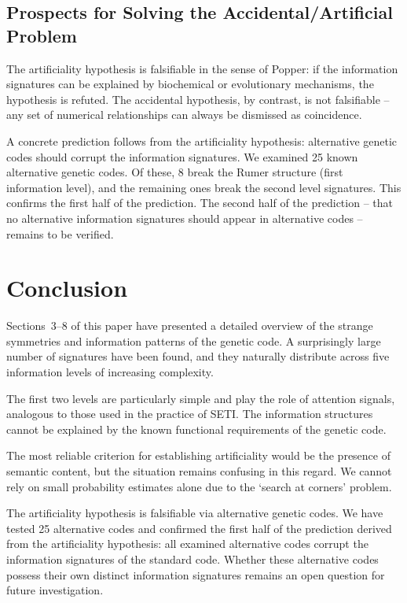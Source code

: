\documentclass[12pt]{article}
\begin{document}
\subsection{Prospects for Solving the Accidental/Artificial Problem}

The artificiality hypothesis is falsifiable in the sense of Popper: if the information signatures can be explained by biochemical or evolutionary mechanisms, the hypothesis is refuted. The accidental hypothesis, by contrast, is not falsifiable -- any set of numerical relationships can always be dismissed as coincidence.

A concrete prediction follows from the artificiality hypothesis: alternative genetic codes should corrupt the information signatures. We examined 25 known alternative genetic codes. Of these, 8 break the Rumer structure (first information level), and the remaining ones break the second level signatures. This confirms the first half of the prediction. The second half of the prediction -- that no alternative information signatures should appear in alternative codes -- remains to be verified.


\section{Conclusion}

Sections~3--8 of this paper have presented a detailed overview of the strange symmetries and information patterns of the genetic code. A surprisingly large number of signatures have been found, and they naturally distribute across five information levels of increasing complexity.

The first two levels are particularly simple and play the role of attention signals, analogous to those used in the practice of SETI. The information structures cannot be explained by the known functional requirements of the genetic code.

The most reliable criterion for establishing artificiality would be the presence of semantic content, but the situation remains confusing in this regard. We cannot rely on small probability estimates alone due to the `search at corners' problem.

The artificiality hypothesis is falsifiable via alternative genetic codes. We have tested 25 alternative codes and confirmed the first half of the prediction derived from the artificiality hypothesis: all examined alternative codes corrupt the information signatures of the standard code. Whether these alternative codes possess their own distinct information signatures remains an open question for future investigation.
\end{document}
